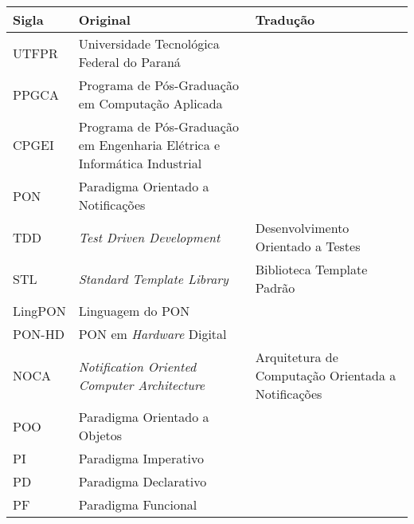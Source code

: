 \begin{tabframed}[h!]
\begin{tabularx}{\textwidth}{l|X|X}
Sigla   & Original                                                                  & Tradução                                           \\ \hline
UTFPR   & Universidade Tecnológica Federal do Paraná                                &                                                    \\ \hline
PPGCA   & Programa de Pós-Graduação em Computação Aplicada                          &                                                    \\ \hline
CPGEI   & Programa de Pós-Graduação em Engenharia Elétrica e Informática Industrial &                                                    \\ \hline
PON     & Paradigma Orientado a Notificações                                        &                                                    \\ \hline
TDD     & \textit{Test Driven Development}                                          & Desenvolvimento Orientado a Testes                 \\ \hline
STL     & \textit{Standard Template Library}                                        & Biblioteca Template Padrão                         \\ \hline
LingPON & Linguagem do PON                                                          &                                                    \\ \hline
PON-HD  & PON em \textit{Hardware} Digital                                          &                                                    \\ \hline
NOCA    & \textit{Notification Oriented Computer Architecture}                      & Arquitetura de Computação Orientada a Notificações \\ \hline
POO     & Paradigma Orientado a Objetos                                             &                                                    \\ \hline
PI      & Paradigma Imperativo                                                      &                                                    \\ \hline
PD      & Paradigma Declarativo                                                     &                                                    \\ \hline
PF      & Paradigma Funcional                                                       &                                                    \\ \hline

\end{tabularx}
\end{tabframed}

